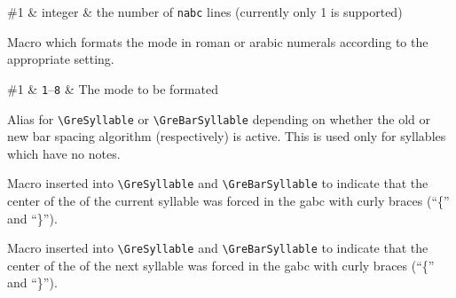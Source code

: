 \begin{argtable}
  \#1 & integer & the number of \texttt{nabc} lines (currently only 1 is supported)\\
\end{argtable}


Macro which formats the mode in roman or arabic numerals according to the appropriate setting.

\begin{argtable}
  \#1 & \texttt{1}--\texttt{8} & The mode to be formated\\
\end{argtable}

Alias for \verb=\GreSyllable= or \verb=\GreBarSyllable= depending on whether the old or new bar spacing algorithm (respectively) is active.  This is used only for syllables which have no notes.

Macro inserted into \verb=\GreSyllable= and \verb=\GreBarSyllable= to indicate that the center of the of the current syllable was forced in the gabc with curly braces (``\{'' and ``\}'').

Macro inserted into \verb=\GreSyllable= and \verb=\GreBarSyllable= to indicate that the center of the of the next syllable was forced in the gabc with curly braces (``\{'' and ``\}'').


